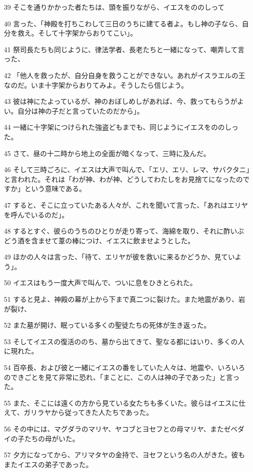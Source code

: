\par 39 そこを通りかかった者たちは、頭を振りながら、イエスをののしって
\par 40 言った、「神殿を打ちこわして三日のうちに建てる者よ。もし神の子なら、自分を救え。そして十字架からおりてこい」。
\par 41 祭司長たちも同じように、律法学者、長老たちと一緒になって、嘲弄して言った、
\par 42 「他人を救ったが、自分自身を救うことができない。あれがイスラエルの王なのだ。いま十字架からおりてみよ。そうしたら信じよう。
\par 43 彼は神にたよっているが、神のおぼしめしがあれば、今、救ってもらうがよい。自分は神の子だと言っていたのだから」。
\par 44 一緒に十字架につけられた強盗どもまでも、同じようにイエスをののしった。
\par 45 さて、昼の十二時から地上の全面が暗くなって、三時に及んだ。
\par 46 そして三時ごろに、イエスは大声で叫んで、「エリ、エリ、レマ、サバクタニ」と言われた。それは「わが神、わが神、どうしてわたしをお見捨てになったのですか」という意味である。
\par 47 すると、そこに立っていたある人々が、これを聞いて言った、「あれはエリヤを呼んでいるのだ」。
\par 48 するとすぐ、彼らのうちのひとりが走り寄って、海綿を取り、それに酢いぶどう酒を含ませて葦の棒につけ、イエスに飲ませようとした。
\par 49 ほかの人々は言った、「待て、エリヤが彼を救いに来るかどうか、見ていよう」。
\par 50 イエスはもう一度大声で叫んで、ついに息をひきとられた。
\par 51 すると見よ、神殿の幕が上から下まで真二つに裂けた。また地震があり、岩が裂け、
\par 52 また墓が開け、眠っている多くの聖徒たちの死体が生き返った。
\par 53 そしてイエスの復活ののち、墓から出てきて、聖なる都にはいり、多くの人に現れた。
\par 54 百卒長、および彼と一緒にイエスの番をしていた人々は、地震や、いろいろのできごとを見て非常に恐れ、「まことに、この人は神の子であった」と言った。
\par 55 また、そこには遠くの方から見ている女たちも多くいた。彼らはイエスに仕えて、ガリラヤから従ってきた人たちであった。
\par 56 その中には、マグダラのマリヤ、ヤコブとヨセフとの母マリヤ、またゼベダイの子たちの母がいた。
\par 57 夕方になってから、アリマタヤの金持で、ヨセフという名の人がきた。彼もまたイエスの弟子であった。
